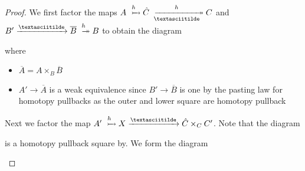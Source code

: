 \begin{prop}
\begin{proof}
        We first factor the maps $A\xtailrightarrow{h}\hat{C}\xtwoheadrightarrow[\textasciitilde]{h} C$ and $B'\xrightarrow{\textasciitilde}\overline{B}\xtwoheadrightarrow{h} B$ to obtain the diagram
        \begin{center}
        \end{center}
        where 
        \begin{itemize}
            \item $\overline{A}=A\times_{B}\overline{B}$
            \item $A'\to \overline{A}$ is a weak equivalence since $B'\to\overline{B}$ is one by the pasting law for homotopy pullbacks as the outer and lower square are homotopy pullback
        \end{itemize}
        Next we factor the map $A'\xtailrightarrow{h}X\xrightarrow{\textasciitilde}\hat{C}\times_CC'$. 
        Note that the diagram 
        \begin{center}
        \end{center}
        is a homotopy pullback square by.
        We form the diagram
        \begin{center}
\end{center}
\end{proof}
\end{prop}
